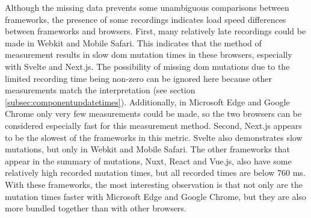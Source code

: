 \documentclass[a4paper, 10pt]{article}
\begin{document}
Although the missing data prevents some unambiguous comparisons between frameworks, the presence of some recordings indicates load speed differences between frameworks and browsers.
First, many relatively late recordings could be made in Webkit and Mobile Safari.
This indicates that the method of measurement results in slow \acrshort{dom} mutation times in these browsers, especially with Svelte and Next.js.
The possibility of missing \acrshort{dom} mutations due to the limited recording time being non-zero can be ignored here because other measurements match the interpretation (see section \ref{subsec:componentupdatetimes}). %
Additionally, in Microsoft Edge and Google Chrome only very few measurements could be made, so the two browsers can be considered especially fast for this measurement method.
Second, Next.js appears to be the slowest of the frameworks in this metric.
Svelte also demonstrates slow mutations, but only in Webkit and Mobile Safari.
The other frameworks that appear in the summary of mutations, Nuxt, React and Vue.js, also have some relatively high recorded mutation times, but all recorded times are below 760 ms.
With these frameworks, the most interesting observation is that not only are the mutation times faster with Microsoft Edge and Google Chrome, but they are also more bundled together than with other browsers.
\end{document}
